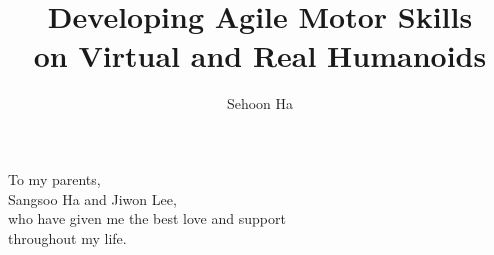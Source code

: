 \documentclass[12pt]{gatech-thesis}
\title{Developing Agile Motor Skills \protect\\
  on Virtual and Real Humanoids}
\author{Sehoon Ha}
\begin{document}

\begin{preliminary}
\begin{dedication}
\null\vfil
{\large
\begin{center}
To my parents, \\\vspace{12pt}
Sangsoo Ha and Jiwon Lee, \\\vspace{12pt}
who have given me the best love and support \\\vspace{12pt}
throughout my life.
\end{center}}
\vfil\null
\end{dedication}
\begin{acknowledgements}

\end{acknowledgements}
\contents
\begin{summary}

\end{summary}
\end{preliminary}













\begin{postliminary}

\begin{vita}
  
\end{vita}
\end{postliminary}
\end{document}
